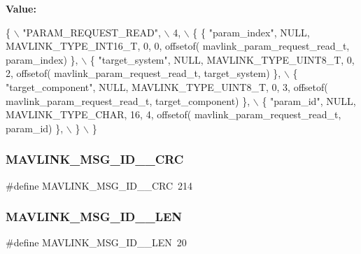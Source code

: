 {\bfseries Value\+:}
\begin{DoxyCode}
\{ \(\backslash\)
    \textcolor{stringliteral}{"PARAM\_REQUEST\_READ"}, \(\backslash\)
    4, \(\backslash\)
    \{  \{ \textcolor{stringliteral}{"param\_index"}, NULL, MAVLINK_TYPE_INT16_T, 0, 0, offsetof(
      mavlink_param_request_read_t, param_index) \}, \(\backslash\)
         \{ \textcolor{stringliteral}{"target\_system"}, NULL, MAVLINK_TYPE_UINT8_T, 0, 2, offsetof(
      mavlink_param_request_read_t, target\_system) \}, \(\backslash\)
         \{ \textcolor{stringliteral}{"target\_component"}, NULL, MAVLINK_TYPE_UINT8_T, 0, 3, offsetof(
      mavlink_param_request_read_t, target\_component) \}, \(\backslash\)
         \{ \textcolor{stringliteral}{"param\_id"}, NULL, MAVLINK_TYPE_CHAR, 16, 4, offsetof(
      mavlink_param_request_read_t, param\_id) \}, \(\backslash\)
         \} \(\backslash\)
\}
\end{DoxyCode}
\mbox{\label{mavlink__msg__param__request__read_8h_a282190afc45b63254fda2b32ccd6e5c2}} 
\subsubsection{M\+A\+V\+L\+I\+N\+K\+\_\+\+M\+S\+G\+\_\+\+I\+D\+\_\+\_\+\+C\+RC}
{\footnotesize\ttfamily \#define M\+A\+V\+L\+I\+N\+K\+\_\+\+M\+S\+G\+\_\+\+I\+D\+\_\+\_\+\+C\+RC~214}

\mbox{\label{mavlink__msg__param__request__read_8h_a351801277ee41efac492ae32612ad233}} 
\subsubsection{M\+A\+V\+L\+I\+N\+K\+\_\+\+M\+S\+G\+\_\+\+I\+D\+\_\+\_\+\+L\+EN}
{\footnotesize\ttfamily \#define M\+A\+V\+L\+I\+N\+K\+\_\+\+M\+S\+G\+\_\+\+I\+D\+\_\+\_\+\+L\+EN~20}

